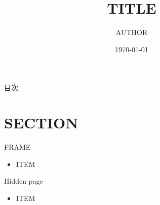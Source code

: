 \documentclass[dvipdfmx,aspectratio=169,t,14pt]{beamer}
\title{TITLE}
\date{\today}
\author{AUTHOR}
\institute{INSTITUTE}
\begin{document}
\maketitle

\begin{frame}{目次}
    \tableofcontents[hideallsubsections]
\end{frame}

\section{SECTION}

\begin{frame}{FRAME}
    \begin{itemize}
        \item ITEM
    \end{itemize}
\end{frame}

\appendix

\begin{frame}[noframenumbering]{Hidden page}
    \begin{itemize}
        \item ITEM
    \end{itemize}
\end{frame}
\end{document}
